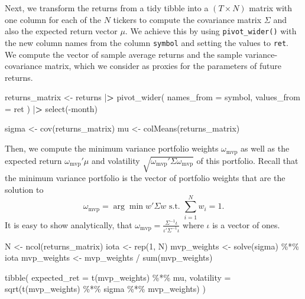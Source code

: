 \documentclass[
]{book}
\newenvironment{Shaded}{\begin{snugshade}}{\end{snugshade}}
\newcommand{\AttributeTok}[1]{\textcolor[rgb]{0.61,0.61,0.61}{#1}}
\newcommand{\DecValTok}[1]{\textcolor[rgb]{0.06,0.06,0.06}{#1}}
\newcommand{\ErrorTok}[1]{\textcolor[rgb]{0.14,0.14,0.14}{\textbf{#1}}}
\newcommand{\FunctionTok}[1]{\textcolor[rgb]{0,0,0}{#1}}
\newcommand{\NormalTok}[1]{#1}
\newcommand{\OtherTok}[1]{\textcolor[rgb]{0.37,0.37,0.37}{#1}}
\newcommand{\SpecialCharTok}[1]{\textcolor[rgb]{0,0,0}{#1}}
\begin{document}
Next, we transform the returns from a tidy tibble into a \((T \times N)\) matrix with one column for each of the \(N\) tickers to compute the covariance matrix \(\Sigma\) and also the expected return vector \(\mu\). We achieve this by using \texttt{pivot\_wider()} with the new column names from the column \texttt{symbol} and setting the values to \texttt{ret}.
We compute the vector of sample average returns and the sample variance-covariance matrix, which we consider as proxies for the parameters of future returns.

\begin{Shaded}
\begin{Highlighting}[]
\NormalTok{returns\_matrix }\OtherTok{\textless{}{-}}\NormalTok{ returns }\SpecialCharTok{|}\ErrorTok{\textgreater{}}
  \FunctionTok{pivot\_wider}\NormalTok{(}
    \AttributeTok{names\_from =}\NormalTok{ symbol,}
    \AttributeTok{values\_from =}\NormalTok{ ret}
\NormalTok{  ) }\SpecialCharTok{|}\ErrorTok{\textgreater{}}
  \FunctionTok{select}\NormalTok{(}\SpecialCharTok{{-}}\NormalTok{month)}

\NormalTok{sigma }\OtherTok{\textless{}{-}} \FunctionTok{cov}\NormalTok{(returns\_matrix)}
\NormalTok{mu }\OtherTok{\textless{}{-}} \FunctionTok{colMeans}\NormalTok{(returns\_matrix)}
\end{Highlighting}
\end{Shaded}

Then, we compute the minimum variance portfolio weights \(\omega_\text{mvp}\) as well as the expected return \(\omega_\text{mvp}'\mu\) and volatility \(\sqrt{\omega_\text{mvp}'\Sigma\omega_\text{mvp}}\) of this portfolio. Recall that the minimum variance portfolio is the vector of portfolio weights that are the solution to
\[\omega_\text{mvp} = \arg\min w'\Sigma w \text{ s.t. } \sum\limits_{i=1}^Nw_i = 1.\]
It is easy to show analytically, that \(\omega_\text{mvp} = \frac{\Sigma^{-1}\iota}{\iota'\Sigma^{-1}\iota}\) where \(\iota\) is a vector of ones.

\begin{Shaded}
\begin{Highlighting}[]
\NormalTok{N }\OtherTok{\textless{}{-}} \FunctionTok{ncol}\NormalTok{(returns\_matrix)}
\NormalTok{iota }\OtherTok{\textless{}{-}} \FunctionTok{rep}\NormalTok{(}\DecValTok{1}\NormalTok{, N)}
\NormalTok{mvp\_weights }\OtherTok{\textless{}{-}} \FunctionTok{solve}\NormalTok{(sigma) }\SpecialCharTok{\%*\%}\NormalTok{ iota}
\NormalTok{mvp\_weights }\OtherTok{\textless{}{-}}\NormalTok{ mvp\_weights }\SpecialCharTok{/} \FunctionTok{sum}\NormalTok{(mvp\_weights)}

\FunctionTok{tibble}\NormalTok{(}
  \AttributeTok{expected\_ret =} \FunctionTok{t}\NormalTok{(mvp\_weights) }\SpecialCharTok{\%*\%}\NormalTok{ mu,}
  \AttributeTok{volatility =} \FunctionTok{sqrt}\NormalTok{(}\FunctionTok{t}\NormalTok{(mvp\_weights) }\SpecialCharTok{\%*\%}\NormalTok{ sigma }\SpecialCharTok{\%*\%}\NormalTok{ mvp\_weights)}
\NormalTok{)}
\end{Highlighting}
\end{Shaded}
\end{document}
